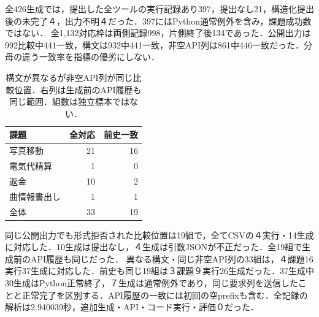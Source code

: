 全426生成では，提出した全ツールの実行記録あり397，提出なし21，構造化提出後の未完了４，出力不明４だった．397にはPython通常例外を含み，課題成功数ではない．
全1,132対応枠は両側記録998，片側終了後134であった．公開出力は992比較中441一致，構文は932中441一致，非空API列は861中446一致だった．分母の違う一致率を指標の優劣にしない．
\begin{table}[tb]
\centering\footnotesize\setlength{\tabcolsep}{3pt}
\caption{構文が異なるが非空API列が同じ比較位置．右列は生成前のAPI履歴も同じ範囲．組数は独立標本ではない．}
\begin{tabular}{lrr}
課題 & 全対応 & 前史一致 \\ \hline
写真移動 & 21 & 16 \\
電気代精算 & 1 & 0 \\
返金 & 10 & 2 \\
曲情報書出し & 1 & 1 \\
全体 & 33 & 19 \\
\hline\end{tabular}
\end{table}
同じ公開出力でも形式拒否された比較位置は19組で，全てCSVの４実行・14生成に対応した．10生成は提出なし，４生成は引数JSONが不正だった．全19組で生成前のAPI履歴も同じだった．
異なる構文・同じ非空API列の33組は，４課題16実行37生成に対応した．前史も同じ19組は３課題９実行26生成だった．37生成中30生成はPython正常終了，７生成は通常例外であり，同じ要求列を送信したことと正常完了を区別する．API履歴の一致には初回の空prefixも含む．全記録の解析は2.940039秒，追加生成・API・コード実行・評価０だった．
